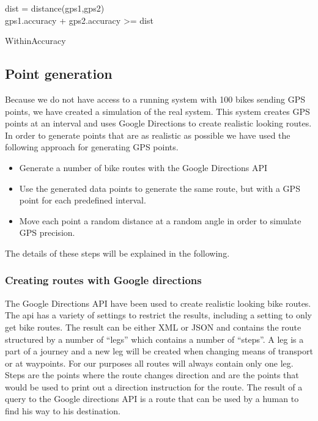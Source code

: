 \begin{algorithm}

dist = distance(gps1,gps2)\\
\Return gps1.accuracy + gps2.accuracy >= dist

\caption{WithinAccuracy}
\label{withinacc}
\end{algorithm}

\subsection{Point generation}
Because we do not have access to a running system with 100 bikes sending GPS points, we have created a simulation of the real system.
This system creates GPS points at an interval and uses Google Directions to create realistic looking routes.
In order to generate points that are as realistic as possible we have used the following approach for generating GPS points.

\begin{itemize}
\item Generate a number of bike routes with the Google Directions API
\item Use the generated data points to generate the same route, but with a GPS point for each predefined interval.
\item Move each point a random distance at a random angle in order to simulate GPS precision.
\end{itemize}

The details of these steps will be explained in the following.

\subsubsection{Creating routes with Google directions}

The Google Directions API \cite{gdirections} have been used to create realistic looking bike routes.
The api has a variety of settings to restrict the results, including a setting to only get bike routes.
The result can be either XML or JSON and contains the route structured by a number of  ``legs'' which contains a number of ``steps''.
A leg is a part of a journey and a new leg will be created when changing means of transport or at waypoints.
For our purposes all routes will always contain only one leg.
Steps are the points where the route changes direction and are the points that would be used to print out a direction instruction for the route.
The result of a query to the Google directions API is a route that can be used by a human to find his way to his destination.

